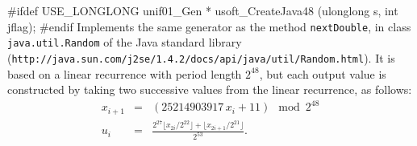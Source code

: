 #ifdef USE_LONGLONG
   unif01_Gen * usoft_CreateJava48 (ulonglong s, int jflag);
#endif
\endcode
  \tab  
  Implements the same generator as the method {\tt nextDouble}, in
%
  class {\tt java.util.Random} of the Java standard library
  ({\tt {http://java.sun.com/j2se/1.4.2/docs/api/java/util/Random.html}}).
  It is based on a linear recurrence with period length $2^{48}$,
  but each output value is constructed by taking
  two successive values from the linear recurrence, as follows:
\begin{eqnarray*}
   x_{i+1} &=& (25214903917\, x_i + 11) \mod 2^{48} \\[6pt]
   u_i &=& \frac{2^{27}\lfloor x_{2i} / 2^{22} \rfloor
                    + \lfloor x_{2i+1} / 2^{21}\rfloor}{2^{53}}.
\end{eqnarray*}
\iffalse %
or equivalently
\begin{eqnarray*}
   u_i &=& \left[(27 << (x_{2i} >> 22)) + (x_{2i+1} >> 21)\right] / 2^{53}.
\end{eqnarray*} 
if $<< p$ and $>> p$ represent the left shift and right shift of the
binary representation by $p$ positions, respectively.
\fi  %
\iffalse %
